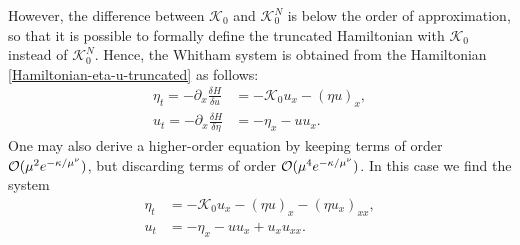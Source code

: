 %
However, the difference between $\mathcal{K}_0$ and $\mathcal{K}_0^N$
is below the order of approximation, so that it is possible
to formally define the truncated Hamiltonian with
$\mathcal{K}_0$ instead of $\mathcal{K}_0^N$.
%
Hence, the Whitham system is obtained from the 
Hamiltonian \eqref{Hamiltonian-eta-u-truncated} as follows:
%
\begin{align}
	\label{sys1}
	\eta_t = - \partial_x \frac{\delta H}{\delta u} 
       &= -  \mathcal{K}_0 u_x - (\eta u)_x, \\
	\label{sys2}
	u_t = -\partial_x \frac{\delta H}{\delta \eta}
       &= - \eta_x - u u_x.
\end{align}
%
One may also derive a higher-order equation by keeping terms of order 
${\mathcal{O}}(\mu^2 e^{-\kappa/\mu^\nu})$, but discarding terms of order ${\mathcal{O}}(\mu^4 e^{-\kappa/\mu^\nu})$.
In this case we find the system
%
\begin{align*}
	\eta_t & = -  \mathcal{K}_0 u_x - (\eta u)_x - (\eta u_x)_{xx}, \\
	u_t    & = - \eta_x - u u_x + u_x u_{xx}.
\end{align*}
%
